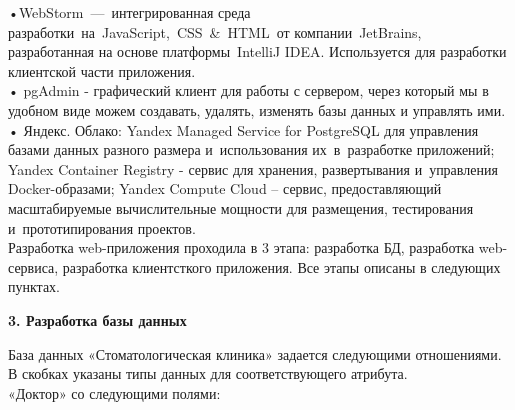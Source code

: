 \documentclass[a4paper]{article}
\begin{document}
\normalsize{•WebStorm — интегрированная среда разработки на JavaScript, CSS & HTML от компании JetBrains, разработанная на основе платформы IntelliJ IDEA. Используется для разработки клиентской части приложения. 
}\\


\normalsize{•	pgAdmin - графический клиент для работы с сервером, через который мы в удобном виде можем создавать, удалять, изменять базы данных и управлять ими.
}\\


\normalsize{• Яндекс. Облако: Yandex Managed Service for PostgreSQL для управления базами данных разного размера и использования их в разработке приложений; Yandex Container Registry - сервис для хранения, развертывания и управления Docker-образами; Yandex Compute Cloud – сервис, предоставляющий масштабируемые вычислительные мощности для размещения, тестирования и прототипирования проектов.
}\\


\normalsize{Разработка web-приложения проходила в 3 этапа: разработка БД, разработка web-сервиса, разработка клиентсткого приложения. Все этапы описаны в следующих пунктах.}\\

\newpage

\hfill \break
\hfill \break
\begin{center}
\Large{\textbf{3. Разработка базы данных
}}\\
\end{center}


\normalsize{База данных «Стоматологическая клиника» задается следующими отношениями. В скобках указаны типы данных для соответствующего атрибута.
}\\


\normalsize{«Доктор» со следующими полями:
}\\
 \begin{itemize}
 \\
 \\
 \\
 \\
 \\
 \\
  \\
 \end{itemize}
\end{document}
